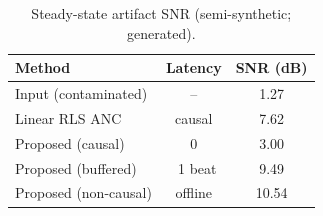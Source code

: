 \begin{table}[!ht]
\centering
\caption{Steady-state artifact SNR (semi-synthetic; generated).}
\label{tab:results}
\begin{tabular}{@{}lcc@{}}
\toprule
Method & Latency & SNR (dB) \\
\midrule
Input (contaminated) & -- & 1.27 \\
Linear RLS ANC & causal & 7.62 \\
Proposed (causal) & 0 & 3.00 \\
Proposed (buffered) & ~1 beat & 9.49 \\
Proposed (non-causal) & offline & 10.54 \\
\bottomrule
\end{tabular}
\end{table}
